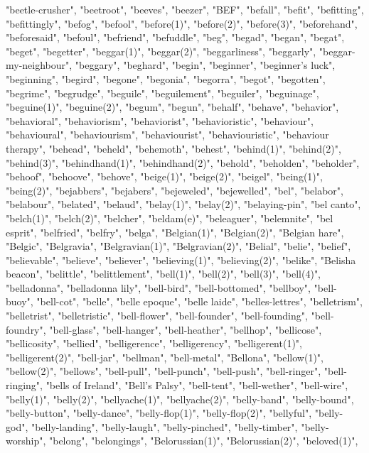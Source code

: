 "beetle-crusher",
"beetroot",
"beeves",
"beezer",
"BEF",
"befall",
"befit",
"befitting",
"befittingly",
"befog",
"befool",
"before(1)",
"before(2)",
"before(3)",
"beforehand",
"beforesaid",
"befoul",
"befriend",
"befuddle",
"beg",
"begad",
"began",
"begat",
"beget",
"begetter",
"beggar(1)",
"beggar(2)",
"beggarliness",
"beggarly",
"beggar-my-neighbour",
"beggary",
"beghard",
"begin",
"beginner",
"beginner's luck",
"beginning",
"begird",
"begone",
"begonia",
"begorra",
"begot",
"begotten",
"begrime",
"begrudge",
"beguile",
"beguilement",
"beguiler",
"beguinage",
"beguine(1)",
"beguine(2)",
"begum",
"begun",
"behalf",
"behave",
"behavior",
"behavioral",
"behaviorism",
"behaviorist",
"behavioristic",
"behaviour",
"behavioural",
"behaviourism",
"behaviourist",
"behaviouristic",
"behaviour therapy",
"behead",
"beheld",
"behemoth",
"behest",
"behind(1)",
"behind(2)",
"behind(3)",
"behindhand(1)",
"behindhand(2)",
"behold",
"beholden",
"beholder",
"behoof",
"behoove",
"behove",
"beige(1)",
"beige(2)",
"beigel",
"being(1)",
"being(2)",
"bejabbers",
"bejabers",
"bejeweled",
"bejewelled",
"bel",
"belabor",
"belabour",
"belated",
"belaud",
"belay(1)",
"belay(2)",
"belaying-pin",
"bel canto",
"belch(1)",
"belch(2)",
"belcher",
"beldam(e)",
"beleaguer",
"belemnite",
"bel esprit",
"belfried",
"belfry",
"belga",
"Belgian(1)",
"Belgian(2)",
"Belgian hare",
"Belgic",
"Belgravia",
"Belgravian(1)",
"Belgravian(2)",
"Belial",
"belie",
"belief",
"believable",
"believe",
"believer",
"believing(1)",
"believing(2)",
"belike",
"Belisha beacon",
"belittle",
"belittlement",
"bell(1)",
"bell(2)",
"bell(3)",
"bell(4)",
"belladonna",
"belladonna lily",
"bell-bird",
"bell-bottomed",
"bellboy",
"bell-buoy",
"bell-cot",
"belle",
"belle epoque",
"belle laide",
"belles-lettres",
"belletrism",
"belletrist",
"belletristic",
"bell-flower",
"bell-founder",
"bell-founding",
"bell-foundry",
"bell-glass",
"bell-hanger",
"bell-heather",
"bellhop",
"bellicose",
"bellicosity",
"bellied",
"belligerence",
"belligerency",
"belligerent(1)",
"belligerent(2)",
"bell-jar",
"bellman",
"bell-metal",
"Bellona",
"bellow(1)",
"bellow(2)",
"bellows",
"bell-pull",
"bell-punch",
"bell-push",
"bell-ringer",
"bell-ringing",
"bells of Ireland",
"Bell's Palsy",
"bell-tent",
"bell-wether",
"bell-wire",
"belly(1)",
"belly(2)",
"bellyache(1)",
"bellyache(2)",
"belly-band",
"belly-bound",
"belly-button",
"belly-dance",
"belly-flop(1)",
"belly-flop(2)",
"bellyful",
"belly-god",
"belly-landing",
"belly-laugh",
"belly-pinched",
"belly-timber",
"belly-worship",
"belong",
"belongings",
"Belorussian(1)",
"Belorussian(2)",
"beloved(1)",
